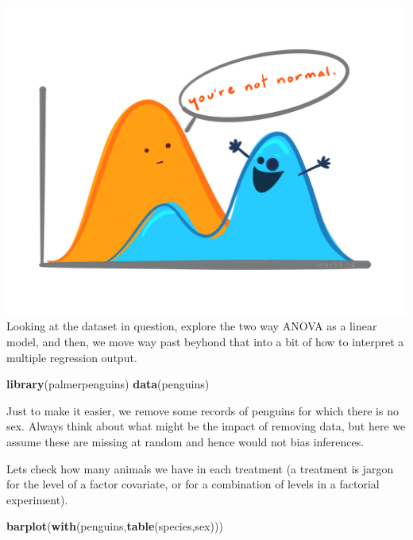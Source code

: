 \documentclass[
]{book}
\newenvironment{Shaded}{\begin{snugshade}}{\end{snugshade}}
\newcommand{\FunctionTok}[1]{\textcolor[rgb]{0.13,0.29,0.53}{\textbf{#1}}}
\newcommand{\NormalTok}[1]{#1}
\newcommand{\OtherTok}[1]{\textcolor[rgb]{0.56,0.35,0.01}{#1}}
\newcommand{\SpecialCharTok}[1]{\textcolor[rgb]{0.81,0.36,0.00}{\textbf{#1}}}
\begin{document}
\includegraphics{extfiles/not_normal.png}
Looking at the dataset in question, explore the two way ANOVA as a linear model, and then, we move way past beyhond that into a bit of how to interpret a multiple regression output.

\begin{Shaded}
\begin{Highlighting}[]
\FunctionTok{library}\NormalTok{(palmerpenguins)}
\FunctionTok{data}\NormalTok{(penguins)}
\end{Highlighting}
\end{Shaded}

Just to make it easier, we remove some records of penguins for which there is no sex. Always think about what might be the impact of removing data, but here we assume these are missing at random and hence would not bias inferences.

\begin{Shaded}
\end{Shaded}

Lets check how many animals we have in each treatment (a treatment is jargon for the level of a factor covariate, or for a combination of levels in a factorial experiment).

\begin{Shaded}
\begin{Highlighting}[]
\FunctionTok{barplot}\NormalTok{(}\FunctionTok{with}\NormalTok{(penguins,}\FunctionTok{table}\NormalTok{(species,sex)))}
\end{Highlighting}
\end{Shaded}
\end{document}
